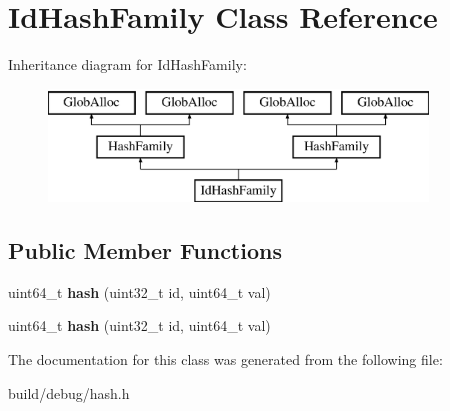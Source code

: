 \hypertarget{classIdHashFamily}{\section{Id\-Hash\-Family Class Reference}
\label{classIdHashFamily}
}
Inheritance diagram for Id\-Hash\-Family\-:\begin{figure}[H]
\begin{center}
\leavevmode
\includegraphics[height=3.000000cm]{classIdHashFamily}
\end{center}
\end{figure}
\subsection*{Public Member Functions}
\begin{DoxyCompactItemize}
\item 
\hypertarget{classIdHashFamily_ad7d484fe595d5f7e94af443ced0e29ea}{uint64\-\_\-t {\bfseries hash} (uint32\-\_\-t id, uint64\-\_\-t val)}\label{classIdHashFamily_ad7d484fe595d5f7e94af443ced0e29ea}

\item 
\hypertarget{classIdHashFamily_ad7d484fe595d5f7e94af443ced0e29ea}{uint64\-\_\-t {\bfseries hash} (uint32\-\_\-t id, uint64\-\_\-t val)}\label{classIdHashFamily_ad7d484fe595d5f7e94af443ced0e29ea}

\end{DoxyCompactItemize}


The documentation for this class was generated from the following file\-:\begin{DoxyCompactItemize}
\item 
build/debug/hash.\-h\end{DoxyCompactItemize}
